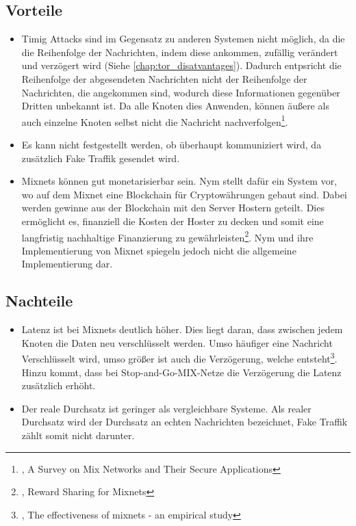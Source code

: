 \subsection{Vorteile}
\label{chap:mixnet_advantages}

\begin{itemize}
    \item Timig Attacks sind im Gegensatz zu anderen Systemen nicht möglich, da die die Reihenfolge der Nachrichten, indem diese ankommen, zufällig verändert und verzögert wird (Siehe \ref{chap:tor_disatvantages}). Dadurch entpsricht die Reihenfolge der abgesendeten Nachrichten nicht der Reihenfolge der Nachrichten, die angekommen sind, wodurch diese Informationen gegenüber Dritten unbekannt ist. Da alle Knoten dies Anwenden, können äußere als auch einzelne Knoten selbst nicht die Nachricht nachverfolgen\footnote{\cite{MixNetworksSecureApplications}, A Survey on Mix Networks and Their Secure Applications}.
    \item Es kann nicht festgestellt werden, ob überhaupt kommuniziert wird, da zusätzlich Fake Traffik gesendet wird.
    \item Mixnets können gut monetarisierbar sein. Nym stellt dafür ein System vor, wo auf dem Mixnet eine Blockchain für Cryptowährungen gebaut sind. Dabei werden gewinne aus der Blockchain mit den Server Hostern geteilt. Dies ermöglicht es, finanziell die Kosten der Hoster zu decken und somit eine langfristig nachhaltige Finanzierung zu gewährleisten\footnote{\cite{RewardSharingForMixnets}, Reward Sharing for Mixnets}. Nym und ihre Implementierung von Mixnet spiegeln jedoch nicht die allgemeine Implementierung dar.
\end{itemize}

\subsection{Nachteile}
\label{chap:mixnet_disadvantages}

\begin{itemize}
    \item Latenz ist bei Mixnets deutlich höher. Dies liegt daran, dass zwischen jedem Knoten die Daten neu verschlüsselt werden. Umso häufiger eine Nachricht Verschlüsselt wird, umso größer ist auch die Verzögerung, welche entsteht\footnote{\cite{EffectivenessOfMixnets}, The effectiveness of mixnets - an empirical study}. Hinzu kommt, dass bei Stop-and-Go-MIX-Netze die Verzögerung die Latenz zusätzlich erhöht.
    \item Der reale Durchsatz ist geringer als vergleichbare Systeme. Als realer Durchsatz wird der Durchsatz an echten Nachrichten bezeichnet, Fake Traffik zählt somit nicht darunter.
\end{itemize}
